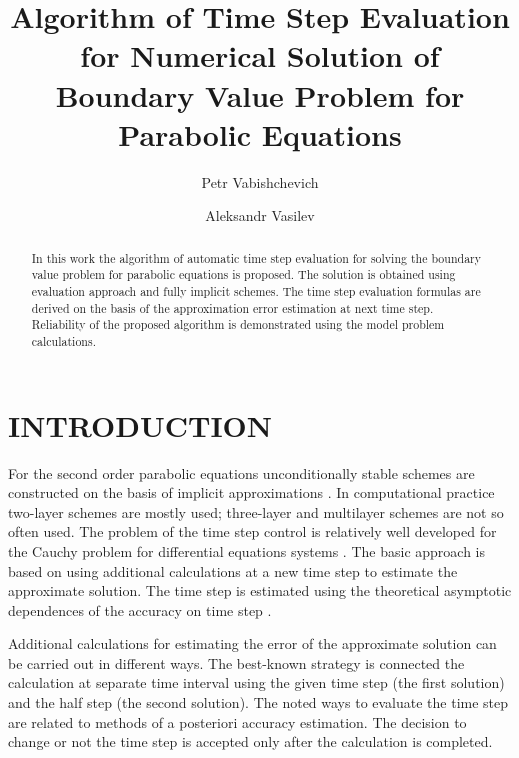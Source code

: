 \documentclass{aip-cp}
\begin{document}
\title{Algorithm of Time Step Evaluation for Numerical Solution of Boundary Value Problem for Parabolic  Equations}


\author[aff1,aff2]{Petr Vabishchevich}
\author[aff1,aff2]{Aleksandr Vasilev}


\maketitle


\begin{abstract}
In this work the algorithm of automatic time step evaluation for solving
the boundary value problem for parabolic equations is proposed.
The solution is obtained using evaluation approach and fully implicit schemes.
The time step evaluation formulas are derived on the basis of the approximation error estimation at next time step.
Reliability of the proposed algorithm is demonstrated using the model problem calculations.
\end{abstract}

\section{INTRODUCTION}
For the second order parabolic equations unconditionally stable schemes are constructed on the basis of implicit approximations \cite{SamarskiiMatusVabischevich2002}.
In computational practice two-layer schemes are mostly used; three-layer and multilayer schemes are not so often used.
The problem of the time step control is relatively well developed for the Cauchy problem for differential equations systems \cite{Gear1971,ascher1998computer,HairerNorsettWanner1987}. 
The basic approach is based on using additional calculations at a new time step to estimate the approximate solution.
The time step is estimated using the theoretical asymptotic dependences of the accuracy on time step \cite{vabishchevich2015priori}.

Additional calculations for estimating the error of the approximate solution can be carried out in different ways. The best-known strategy is connected the calculation at separate time interval using the given time step (the first solution) and the half step (the second solution). The noted ways to evaluate the time step are related to methods of a posteriori accuracy estimation.
The decision to change or not the time step is accepted only after the calculation is completed.
\end{document}
